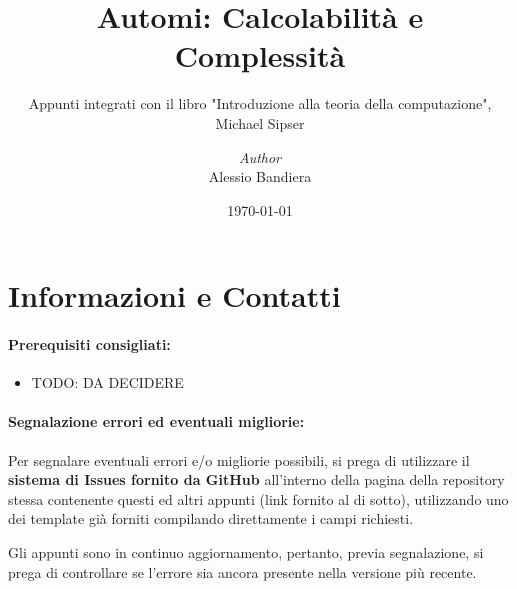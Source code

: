 \documentclass[a4paper, 12pt]{report}
\institute{\curlyquotes{\hspace{0.25mm}Sapienza} Università di Roma}
\title{Automi: Calcolabilità e Complessità}
\subtitle{Appunti integrati con il libro "Introduzione alla teoria della computazione", Michael Sipser}
\author{\textit{Author}\\Alessio Bandiera}
\date{\today}
\begin{document}
    \maketitle

    {
        \hypersetup{allcolors=black}

        \romantableofcontents
    }

    \chapter*{Informazioni e Contatti}      %
    
    \subsubsection{Prerequisiti consigliati:}
    \begin{itemize}
        \item TODO: DA DECIDERE
    \end{itemize}

    \quad

    \subsubsection{Segnalazione errori ed eventuali migliorie:}
    
    Per segnalare eventuali errori e/o migliorie possibili, si prega di utilizzare il \textbf{sistema di Issues fornito da GitHub} all'interno della pagina della repository stessa contenente questi ed altri appunti (link fornito al di sotto), utilizzando uno dei template già forniti compilando direttamente i campi richiesti.

    Gli appunti sono in continuo aggiornamento, pertanto, previa segnalazione, si prega di controllare se l'errore sia ancora presente nella versione più recente.
\end{document}
